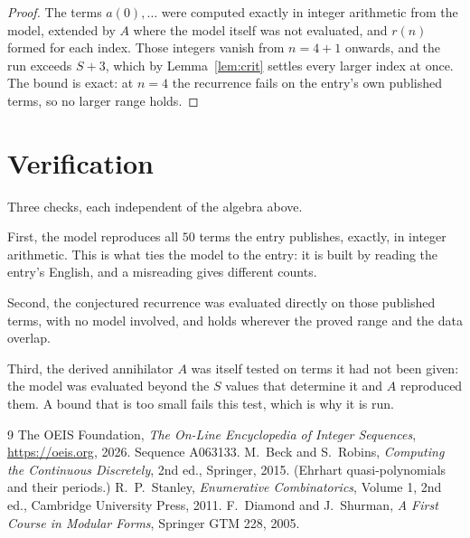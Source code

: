 \documentclass[11pt,a4paper]{article}
\theoremstyle{plain}
\theoremstyle{definition}
\begin{document}
\begin{proof}
The terms $a(0),\dots$ were computed exactly in integer arithmetic from the model, extended by
$A$ where the model itself was not evaluated, and $r(n)$ formed for each index. Those integers
vanish from $n=4+1$ onwards, and the run exceeds $S+3$, which by
Lemma~\ref{lem:crit} settles every larger index at once. The bound is exact: at $n=4$ the recurrence fails on the entry's own published terms, so no larger range holds.
\end{proof}

\section{Verification}

Three checks, each independent of the algebra above.

First, the model reproduces all $50$ terms the entry publishes, exactly, in integer
arithmetic. This is what ties the model to the entry: it is built by reading the entry's
English, and a misreading gives different counts.

Second, the conjectured recurrence was evaluated directly on those published terms, with no
model involved, and holds wherever the proved range and the data overlap.

Third, the derived annihilator $A$ was itself tested on terms it had not been given: the model
was evaluated beyond the $S$ values that determine it and $A$ reproduced them. A bound that is
too small fails this test, which is why it is run.

\begin{thebibliography}{9}
 The OEIS Foundation, \emph{The On-Line Encyclopedia of Integer
Sequences}, \url{https://oeis.org}, 2026. Sequence A063133.
 M.~Beck and S.~Robins, \emph{Computing the Continuous Discretely},
2nd ed., Springer, 2015. (Ehrhart quasi-polynomials and their periods.)
 R.~P.~Stanley, \emph{Enumerative Combinatorics}, Volume 1, 2nd ed.,
Cambridge University Press, 2011.
 F.~Diamond and J.~Shurman, \emph{A First Course in Modular Forms},
Springer GTM 228, 2005.
\end{thebibliography}
\end{document}
